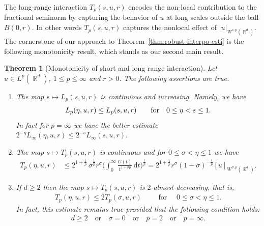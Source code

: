 \documentclass[12pt, reqno]{amsart}%
\theoremstyle{plain}  %
\newtheorem{theorem}{Theorem}[section]
\theoremstyle{definition}  %
\theoremstyle{remark}
\numberwithin{equation}{section}
\DeclareMathOperator{\R}{\mathbb{R}}
\renewcommand{\d}{\,\mathrm{d}}
\begin{document}
The long-range interaction  $T_p(s,u,r)$ encodes the non-local contribution to the fractional seminorm by capturing the behavior of $u$ at long scales outside the ball $ B(0,r)$. In other words $T_p(s,u,r)$ captures  the nonlocal effect of $|u|_{W^{s,p}(\R^d)}$.
\noindent The cornerstone of our approach to Theorem~\ref{thm:robust-interpo-esti} is the following monotonicity result, which stands as our second main result.
\begin{theorem}[Monotonicity of  short and long range interaction]
\label{thm:r-split-monot-semin}
Let  $u\in L^p(\R^d)$, $1\leq p\leq \infty$ and $r>0$. The following assertions are true.
\begin{enumerate}[$(A)$]
\item
The map $s\mapsto  L_p(s,u,r)$ is continuous and  increasing. Namely, we have
\begin{align*}
L_p(\eta, u,r)\leq  L_p(s, u,r)\qquad \text{for \,\, $0\leq  \eta<s\leq 1$}.
\end{align*}
In fact for $p=\infty$ we have the better estimate $
2^{-\eta}L_\infty(\eta, u,r)\leq  2^{-s}L_\infty(s, u,r).$

\item The map $s\mapsto T_p(s,u,r)$ is continuous and for $0\leq \sigma< \eta \leq 1$ we have
\begin{align*}
T_p(\eta, u,r) &\leq 2^{1+\frac{1}{p}}\, \sigma^{\frac{1}{p}} r^{ \sigma}\Big(\int_0^\infty \frac{U(t)}{t^{ 1+\sigma p}} \d t\Big)^{\frac{1}{p}}=2^{1+\frac{1}{p}}  r^\sigma(1-\sigma)^{-\frac{1}{p}}[u]_{W^{\sigma,p}(\R^d)}.
\end{align*}
\item If $d \geq 2$ then the map $s \mapsto T_p(s, u, r)$ is $2$-almost decreasing, that is,
\begin{align*}
T_p(\eta, u, r) \leq2 T_p(\sigma, u, r) \qquad \text{ for }\quad  0 \leq \sigma <\eta \leq 1.
\end{align*}
In fact, this estimate remains true provided that the following condition holds:
\begin{align}\label{cond:interp-admissible}
\tag{G}
d\geq 2\quad \text{or} \quad \sigma = 0 \quad \text{or} \quad p = 2 \quad \text{or} \quad p = \infty.
\end{align}
\end{enumerate}
\end{theorem}
\end{document}
